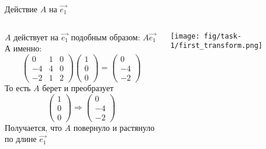 
\begin{frame}{Действие $A$ на $\vec{e_{1}}$}
\begin{columns}
\begin{column}{0.5\paperwidth}
$A$ действует на $\vec{e_{1}}$ подобным образом: $A\vec{e_{1}}$ \\
А именно:
\[
\left(\begin{array}{lll}
    0 & 1 & 0  \\
    -4 & 4 & 0  \\ 
    -2 & 1 & 2 
\end{array}\right)
\left(\begin{array}{l}
    1 \\
    0 \\ 
    0 
\end{array}\right) =
\left(\begin{array}{l}
    0 \\
    -4 \\
    -2
\end{array}\right)
\]
То есть $A$ берет и преобразует
\[
\left(\begin{array}{l}
    1 \\
    0 \\ 
    0 
\end{array}\right) \Rightarrow
\left(\begin{array}{l}
    0 \\
    -4 \\ 
    -2 
\end{array}\right)
\]
Получается, что $A$ повернуло и растянуло по длине $\vec{e_{1}}$
\end{column}
\begin{column}{0.3\paperwidth}
\texttt{[image: fig/task-1/first\_transform.png]}
\end{column}
\end{columns}
\end{frame}


